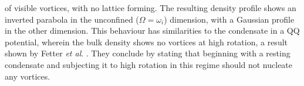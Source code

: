 of visible vortices, with no lattice forming. The resulting density profile shows an inverted parabola in the unconfined ($\Omega = \omega_i$) dimension, with a Gaussian profile in the other dimension. This behaviour has similarities to the condensate in a QQ potential, wherein the bulk density shows no vortices at high rotation, a result shown by Fetter \textit{et al}. \cite{Vtx:Fetter_pra_2005}. They conclude by stating that beginning with a resting condensate and subjecting it to high rotation in this regime should not nucleate any vortices.


